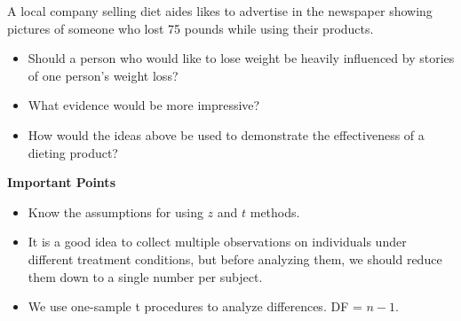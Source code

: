 A local company selling diet aides likes to advertise in the newspaper
showing pictures of someone who lost 75 pounds while using their
products.  
\begin{itemize}
 \item Should a person who would like to lose weight be heavily
   influenced by stories of one person's weight loss?\vspace{1cm}
 \item What evidence would be more impressive?\vspace{1cm}
 \item How would the ideas above be used to demonstrate the
   effectiveness of a dieting product?\vspace{.2cm}
\end{itemize}



\begin{center}
  {\large\bf Important Points}\vspace{-.5cm}
\end{center}
   
\begin{itemize}
  \item Know the assumptions for using $z$ and $t$ methods. \vfill
  \item It is a good idea to collect multiple observations on
    individuals under different treatment conditions, but before
    analyzing them, we should reduce them down to a single number per
    subject.\vfill
  \item We use one-sample t procedures to analyze differences. DF =
    $n-1$. \vspace*{1cm}
\end{itemize}

